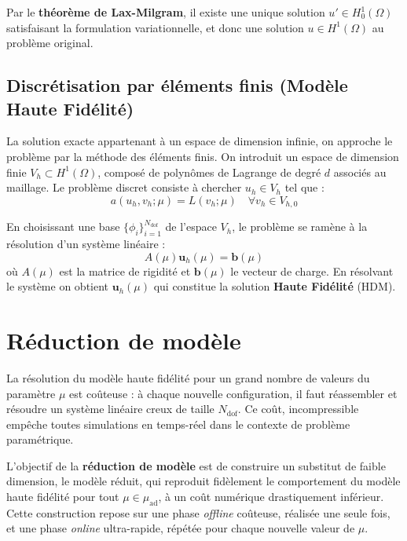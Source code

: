 \documentclass[12pt,a4paper]{article}
\begin{document}
Par le \textbf{théorème de Lax-Milgram}, il existe une unique solution $u' \in H_0^1(\Omega)$ satisfaisant la formulation variationnelle, et donc une solution $u \in H^1(\Omega)$ au problème original.

\subsection{Discrétisation par éléments finis (Modèle Haute Fidélité)}

La solution exacte appartenant à un espace de dimension infinie, on approche le problème par la méthode des éléments finis. On introduit un espace de dimension finie $V_h \subset H^1(\Omega)$, composé de polynômes de Lagrange de degré $d$ associés au maillage. Le problème discret consiste à chercher $u_h \in V_h$ tel que :
\begin{equation*}
    a(u_h, v_h; \mu) = L(v_h; \mu) \quad \forall v_h \in V_{h,0}
\end{equation*}

En choisissant une base $\{\phi_i\}_{i=1}^{N_{\text{dof}}}$ de l'espace $V_h$, le problème se ramène à la résolution d'un système linéaire :
\begin{equation*}
  A(\mu) \mathbf{u}_h(\mu) = \mathbf{b}(\mu)
\end{equation*}
où $A(\mu)$ est la matrice de rigidité et $\mathbf{b}(\mu)$ le vecteur de charge. En résolvant le système on obtient $\mathbf{u}_h(\mu)$ qui constitue la solution \textbf{Haute Fidélité} (HDM).

\section{Réduction de modèle}


La résolution du modèle haute fidélité pour un grand nombre de valeurs du paramètre $\mu$ est coûteuse : à chaque nouvelle configuration, il faut réassembler et résoudre un système linéaire creux de taille $N_{\text{dof}}$. Ce coût, incompressible empêche toutes simulations en temps-réel dans le contexte de problème paramétrique.
 
L'objectif de la \textbf{réduction de modèle} est de construire un substitut de faible dimension, le modèle réduit, qui reproduit fidèlement le comportement du modèle haute fidélité pour tout $\mu \in \mu_{\text{ad}}$, à un coût numérique drastiquement inférieur. Cette construction repose sur une phase \textit{offline} coûteuse, réalisée une seule fois, et une phase \textit{online} ultra-rapide, répétée pour chaque nouvelle valeur de $\mu$.
\end{document}
